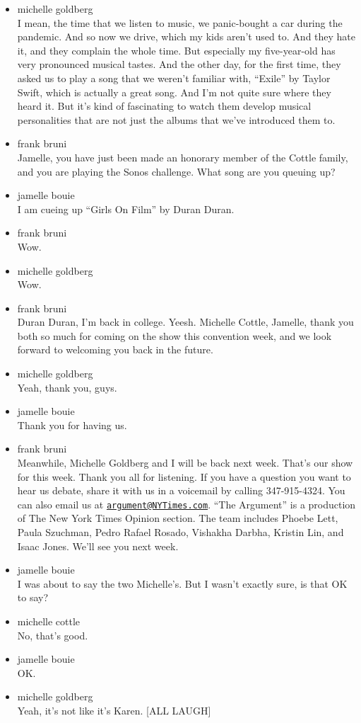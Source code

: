 \begin{itemize}
\item
  michelle goldberg\\
  I mean, the time that we listen to music, we panic-bought a car during
  the pandemic. And so now we drive, which my kids aren't used to. And
  they hate it, and they complain the whole time. But especially my
  five-year-old has very pronounced musical tastes. And the other day,
  for the first time, they asked us to play a song that we weren't
  familiar with, ``Exile'' by Taylor Swift, which is actually a great
  song. And I'm not quite sure where they heard it. But it's kind of
  fascinating to watch them develop musical personalities that are not
  just the albums that we've introduced them to.
\item
  frank bruni\\
  Jamelle, you have just been made an honorary member of the Cottle
  family, and you are playing the Sonos challenge. What song are you
  queuing up?
\item
  jamelle bouie\\
  I am cueing up ``Girls On Film'' by Duran Duran.
\item
  frank bruni\\
  Wow.
\item
  michelle goldberg\\
  Wow.
\item
  frank bruni\\
  Duran Duran, I'm back in college. Yeesh. Michelle Cottle, Jamelle,
  thank you both so much for coming on the show this convention week,
  and we look forward to welcoming you back in the future.
\item
  michelle goldberg\\
  Yeah, thank you, guys.
\item
  jamelle bouie\\
  Thank you for having us.
\item
  frank bruni\\
  Meanwhile, Michelle Goldberg and I will be back next week. That's our
  show for this week. Thank you all for listening. If you have a
  question you want to hear us debate, share it with us in a voicemail
  by calling 347-915-4324. You can also email us at
  \href{mailto:argument@NYTimes.com}{\nolinkurl{argument@NYTimes.com}}.
  ``The Argument'' is a production of The New York Times Opinion
  section. The team includes Phoebe Lett, Paula Szuchman, Pedro Rafael
  Rosado, Vishakha Darbha, Kristin Lin, and Isaac Jones. We'll see you
  next week.
\item
  jamelle bouie\\
  I was about to say the two Michelle's. But I wasn't exactly sure, is
  that OK to say?
\item
  michelle cottle\\
  No, that's good.
\item
  jamelle bouie\\
  OK.
\item
  michelle goldberg\\
  Yeah, it's not like it's Karen. {[}ALL LAUGH{]}
\end{itemize}


